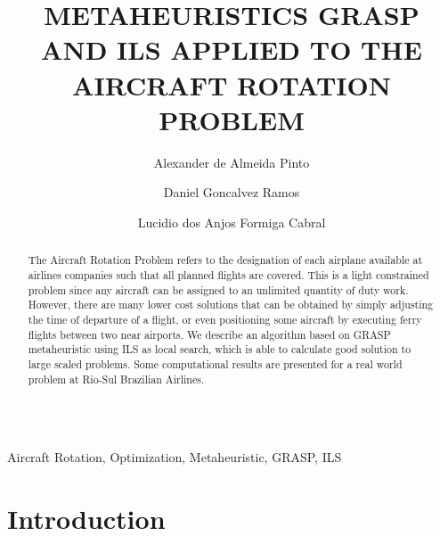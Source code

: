 \documentclass{endm}
\begin{document}
\begin{verbatim}\end{verbatim}\vspace{2.5cm}

\begin{frontmatter}

\title{METAHEURISTICS GRASP AND ILS APPLIED TO THE AIRCRAFT ROTATION PROBLEM}

\author{Alexander de Almeida Pinto}
\address{Laboratory for Applications of Digital Video\\ Federal University of Paraiba \\ Joao Pessoa, Brazil}

\author{Daniel Goncalvez Ramos}
\address{Laboratory for Applications of Digital Video\\ Federal University of Paraiba \\ Joao Pessoa, Brazil}

\author{Lucidio dos Anjos Formiga Cabral}
\address{Departament of Informatic\\ Federal University of Paraiba \\ Joao Pessoa, Brazil}

\begin{abstract}
The Aircraft Rotation Problem refers to the designation of each airplane available at airlines companies such that all planned flights are covered. This is a light constrained problem since any aircraft can be assigned to an unlimited quantity of duty work. However, there are many lower cost solutions that can be obtained by simply adjusting the time of departure of a flight, or even positioning some aircraft by executing ferry flights between two near airports. We describe an algorithm based on GRASP metaheuristic using ILS as local search, which is able to calculate good solution to large scaled problems. Some computational results are presented for a real world problem at Rio-Sul Brazilian Airlines.
\end{abstract}

\begin{keyword}
Aircraft Rotation, Optimization, Metaheuristic, GRASP, ILS
\end{keyword}

\end{frontmatter}


\section{Introduction}\label{intro}
\end{document}
